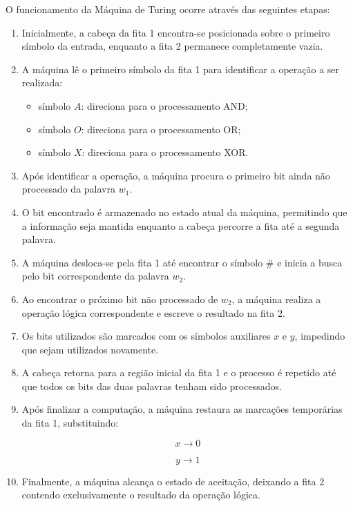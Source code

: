 \documentclass[report, 12pt]{uftreport}
\begin{document}
O funcionamento da Máquina de Turing ocorre através das seguintes etapas:

\begin{enumerate}

\item Inicialmente, a cabeça da fita 1 encontra-se posicionada sobre o
primeiro símbolo da entrada, enquanto a fita 2 permanece completamente vazia.

\item A máquina lê o primeiro símbolo da fita 1 para identificar a operação
a ser realizada:

\begin{itemize}
    \item símbolo $A$: direciona para o processamento AND;
    \item símbolo $O$: direciona para o processamento OR;
    \item símbolo $X$: direciona para o processamento XOR.
\end{itemize}

\item Após identificar a operação, a máquina procura o primeiro bit ainda não
processado da palavra $w_1$.

\item O bit encontrado é armazenado no estado atual da máquina, permitindo
que a informação seja mantida enquanto a cabeça percorre a fita até a segunda
palavra.

\item A máquina desloca-se pela fita 1 até encontrar o símbolo $\#$ e inicia
a busca pelo bit correspondente da palavra $w_2$.

\item Ao encontrar o próximo bit não processado de $w_2$, a máquina realiza a
operação lógica correspondente e escreve o resultado na fita 2.

\item Os bits utilizados são marcados com os símbolos auxiliares $x$ e $y$,
impedindo que sejam utilizados novamente.

\item A cabeça retorna para a região inicial da fita 1 e o processo é repetido
até que todos os bits das duas palavras tenham sido processados.

\item Após finalizar a computação, a máquina restaura as marcações temporárias
da fita 1, substituindo:

\[
x \rightarrow 0
\]

\[
y \rightarrow 1
\]

\item Finalmente, a máquina alcança o estado de aceitação, deixando a fita 2
contendo exclusivamente o resultado da operação lógica.

\end{enumerate}
\end{document}
